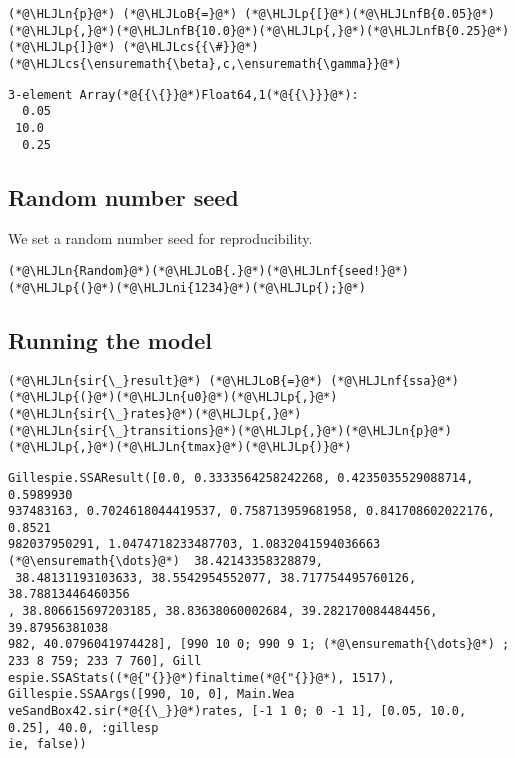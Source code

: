 \documentclass[12pt,a4paper]{article}
\newcommand{\HLJLn}[1]{#1}
\newcommand{\HLJLnf}[1]{\textcolor[RGB]{66,102,213}{#1}}
\newcommand{\HLJLnfB}[1]{\textcolor[RGB]{59,151,46}{#1}}
\newcommand{\HLJLni}[1]{\textcolor[RGB]{59,151,46}{#1}}
\newcommand{\HLJLoB}[1]{\textcolor[RGB]{102,102,102}{\textbf{#1}}}
\newcommand{\HLJLp}[1]{#1}
\newcommand{\HLJLcs}[1]{\textcolor[RGB]{153,153,119}{\textit{#1}}}
\begin{document}
\begin{lstlisting}
(*@\HLJLn{p}@*) (*@\HLJLoB{=}@*) (*@\HLJLp{[}@*)(*@\HLJLnfB{0.05}@*)(*@\HLJLp{,}@*)(*@\HLJLnfB{10.0}@*)(*@\HLJLp{,}@*)(*@\HLJLnfB{0.25}@*)(*@\HLJLp{]}@*) (*@\HLJLcs{{\#}}@*) (*@\HLJLcs{\ensuremath{\beta},c,\ensuremath{\gamma}}@*)
\end{lstlisting}

\begin{lstlisting}
3-element Array(*@{{\{}}@*)Float64,1(*@{{\}}}@*):
  0.05
 10.0
  0.25
\end{lstlisting}


\subsection{Random number seed}
We set a random number seed for reproducibility.


\begin{lstlisting}
(*@\HLJLn{Random}@*)(*@\HLJLoB{.}@*)(*@\HLJLnf{seed!}@*)(*@\HLJLp{(}@*)(*@\HLJLni{1234}@*)(*@\HLJLp{);}@*)
\end{lstlisting}


\subsection{Running the model}

\begin{lstlisting}
(*@\HLJLn{sir{\_}result}@*) (*@\HLJLoB{=}@*) (*@\HLJLnf{ssa}@*)(*@\HLJLp{(}@*)(*@\HLJLn{u0}@*)(*@\HLJLp{,}@*)(*@\HLJLn{sir{\_}rates}@*)(*@\HLJLp{,}@*)(*@\HLJLn{sir{\_}transitions}@*)(*@\HLJLp{,}@*)(*@\HLJLn{p}@*)(*@\HLJLp{,}@*)(*@\HLJLn{tmax}@*)(*@\HLJLp{)}@*)
\end{lstlisting}

\begin{lstlisting}
Gillespie.SSAResult([0.0, 0.3333564258242268, 0.4235035529088714, 0.5989930
937483163, 0.7024618044419537, 0.758713959681958, 0.841708602022176, 0.8521
982037950291, 1.0474718233487703, 1.0832041594036663  (*@\ensuremath{\dots}@*)  38.42143358328879,
 38.48131193103633, 38.5542954552077, 38.717754495760126, 38.78813446460356
, 38.806615697203185, 38.83638060002684, 39.282170084484456, 39.87956381038
982, 40.0796041974428], [990 10 0; 990 9 1; (*@\ensuremath{\dots}@*) ; 233 8 759; 233 7 760], Gill
espie.SSAStats((*@{"{}}@*)finaltime(*@{"{}}@*), 1517), Gillespie.SSAArgs([990, 10, 0], Main.Wea
veSandBox42.sir(*@{{\_}}@*)rates, [-1 1 0; 0 -1 1], [0.05, 10.0, 0.25], 40.0, :gillesp
ie, false))
\end{lstlisting}
\end{document}
